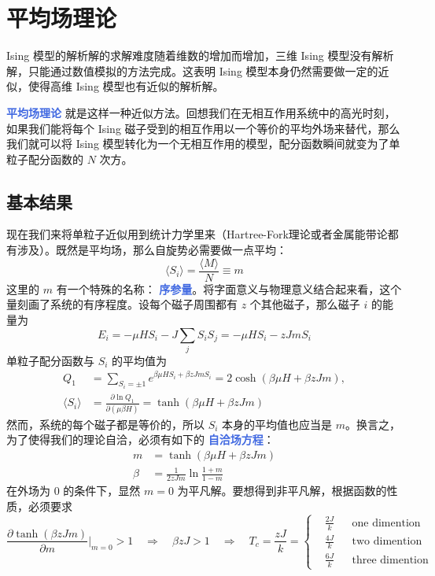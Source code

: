 \section{平均场理论}\label{sec:平均场理论}

Ising 模型的解析解的求解难度随着维数的增加而增加，三维 Ising 模型没有解析解，只能通过数值模拟的方法完成。这表明 Ising 模型本身仍然需要做一定的近似，使得高维 Ising 模型也有近似的解析解。

\textcolor{RoyalBlue}{\textbf{\kaishu 平均场理论}}  就是这样一种近似方法。回想我们在无相互作用系统中的高光时刻，如果我们能将每个 Ising 磁子受到的相互作用以一个等价的平均外场来替代，那么我们就可以将 Ising 模型转化为一个无相互作用的模型，配分函数瞬间就变为了单粒子配分函数的 $N$ 次方。

\subsection{基本结果}\label{sub:基本结果}
现在我们来将单粒子近似用到统计力学里来（Hartree-Fork理论或者金属能带论都有涉及）。既然是平均场，那么自旋势必需要做一点平均：
\begin{equation}
    \langle S_i \rangle = \frac{\langle M \rangle}{N} \equiv m
\end{equation}
这里的 $m$ 有一个特殊的名称： \textcolor{RoyalBlue}{\textbf{\kaishu 序参量}}。将字面意义与物理意义结合起来看，这个量刻画了系统的有序程度。设每个磁子周围都有 $z$ 个其他磁子，那么磁子 $i$ 的能量为
\begin{equation}
    E_i = -\mu HS_i - J \sum_j S_i S_j = -\mu HS_i - zJmS_i
\end{equation}
单粒子配分函数与 $S_i$ 的平均值为
\begin{align}
    Q_1 &= \sum_{S_i = \pm 1} e^{\beta \mu HS_i + \beta zJmS_i} = 2\cosh (\beta \mu H + \beta zJm),\\
    \langle S_i \rangle &= \frac{\partial \ln Q_1}{\partial (\mu\beta H)} = \tanh (\beta \mu H + \beta zJm)
\end{align}
然而，系统的每个磁子都是等价的，所以 $S_i$ 本身的平均值也应当是 $m$。换言之，为了使得我们的理论自洽，必须有如下的 \textcolor{RoyalBlue}{\textbf{\kaishu 自洽场方程}}：
\begin{equation}
    \begin{aligned}
        m &= \tanh (\beta \mu H + \beta zJm)\\
        \beta &= \frac{1}{2zJm} \ln \frac{1+m}{1-m} 
    \end{aligned}
\end{equation}
在外场为 $0$ 的条件下，显然 $m = 0$ 为平凡解。要想得到非平凡解，根据函数的性质，必须要求
\begin{equation}
    \frac{\partial \tanh (\beta zJm)}{\partial m} \bigg|_{m = 0} > 1 \quad \Rightarrow \quad \beta zJ > 1 \quad \Rightarrow \quad T_c = \frac{zJ}{k} = \left\{\begin{aligned}
        &\frac{2J}{k} && \text{one dimention} \\
        &\frac{4J}{k} && \text{two dimention} \\
        &\frac{6J}{k} && \text{three dimention} 
    \end{aligned}\right.
\end{equation}

